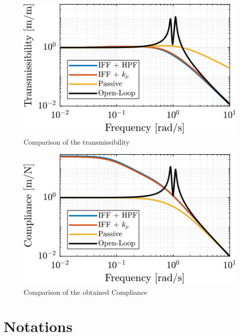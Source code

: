 \documentclass[a4paper, 10pt, DIV=12, parskip=full]{scrreprt}
\begin{document}
\begin{figure}[htbp]
\centering
\includegraphics[scale=1]{figs/comp_transmissibility.png}
\caption{\label{fig:comp_transmissibility}Comparison of the transmissibility}
\end{figure}

\begin{figure}[htbp]
\centering
\includegraphics[scale=1]{figs/comp_compliance.png}
\caption{\label{fig:comp_compliance}Comparison of the obtained Compliance}
\end{figure}

\chapter{Notations}
\label{sec:org61801fb}
\label{sec:notations}
\end{document}
